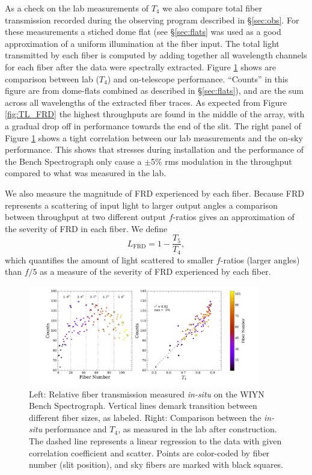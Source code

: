 \begin{appendices}
As a check on the lab measurements of $T_4$ we also compare total
fiber transmission recorded during the observing program described in
\S\ref{sec:obs}. For these measurements a stiched dome flat (see
\S\ref{sec:flats} was used as a good approximation of a uniform
illumination at the fiber input. The total light transmitted by each
fiber is computed by adding together all wavelength channels for each
fiber after the data were spectrally extracted. Figure
\ref{fig:count_tput} shows are comparison between lab ($T_4$) and
on-telescope performance. ``Counts'' in this figure are from
dome-flats combined as described in \S\ref{sec:flats}), and are the
sum across all wavelengths of the extracted fiber traces.  As expected
from Figure \ref{fig:TL_FRD} the highest throughputs are found in the
middle of the array, with a gradual drop off in performance towards
the end of the slit. The right panel of Figure \ref{fig:count_tput}
shows a tight correlation between our lab measurements and the on-sky
performance. This shows that stresses during installation and the
performance of the Bench Spectrograph only cause a $\pm$5\% rms
modulation in the throughput compared to what was measured in the lab.

We also measure the magnitude of FRD experienced by each
fiber. Because FRD represents a scattering of input light to larger
output angles a comparison between throughput at two different output
$f$-ratios gives an approximation of the severity of FRD in each
fiber. We define
\begin{equation}
\label{eq:L_FRD}
  L_\mathrm{FRD} = 1 - \frac{T_5}{T_4},
\end{equation}
which quantifies the amount of light scattered to smaller $f$-ratios
(larger angles) than $f/5$ as a measure of the severity of FRD
experienced by each fiber.

\begin{figure}
  \centering
  \includegraphics[width=0.9\textwidth]{891_1/figs/gradpak_count_plots.pdf}
  \caption{\label{fig:count_tput} Left: Relative fiber transmission
    measured \emph{in-situ} on the WIYN Bench Spectrograph. Vertical
    lines demark transition between different fiber sizes, as
    labeled. Right: Comparison between the \emph{in-situ} performance
    and $T_4$, as measured in the lab after construction. The dashed
    line represents a linear regression to the data with given
    correlation coefficient and scatter. Points are color-coded by
    fiber number (slit position), and sky fibers are marked with black
    squares.}
\end{figure}


\end{appendices}
